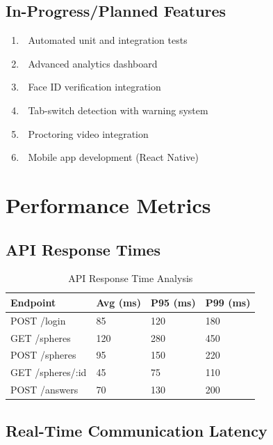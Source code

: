 \documentclass[12pt,a4paper]{report}
\newcommand{\rA}{\rowcolor{white}}
\newcommand{\rB}{\rowcolor{lightgray}}
\newcommand{\rH}{\rowcolor{headcol}}
\begin{document}
\subsection{In-Progress/Planned Features}

\begin{enumerate}[left=0pt]
  \item 🔄 Automated unit and integration tests
  \item 🔄 Advanced analytics dashboard
  \item 🔄 Face ID verification integration
  \item 🔄 Tab-switch detection with warning system
  \item 🔄 Proctoring video integration
  \item 🔄 Mobile app development (React Native)
\end{enumerate}

\section{Performance Metrics}

\subsection{API Response Times}

\begin{table}[H]
  \centering
  \small
  \begin{tabular}{|l|l|l|l|}
    \hline
    \rH \textbf{Endpoint} & \textbf{Avg (ms)} & \textbf{P95 (ms)} & \textbf{P99 (ms)} \\
    \hline
    \rA POST /login & 85 & 120 & 180 \\
    \hline
    \rB GET /spheres & 120 & 280 & 450 \\
    \hline
    \rA POST /spheres & 95 & 150 & 220 \\
    \hline
    \rB GET /spheres/:id & 45 & 75 & 110 \\
    \hline
    \rA POST /answers & 70 & 130 & 200 \\
    \hline
  \end{tabular}
  \caption{API Response Time Analysis}
  \label{tab:api_times}
\end{table}

\subsection{Real-Time Communication Latency}
\end{document}
